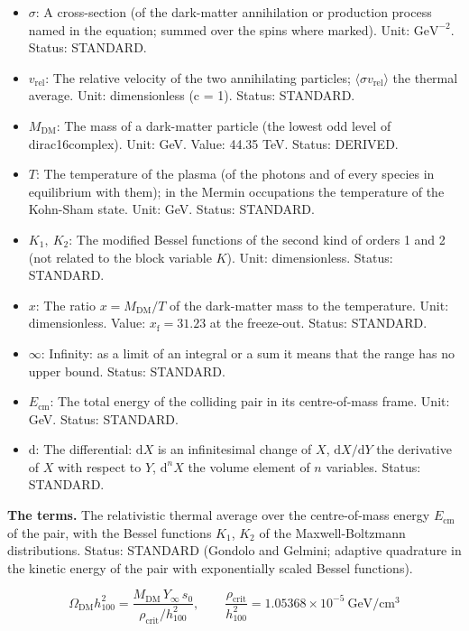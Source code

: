 \documentclass[
  10pt,
]{article}
\providecommand{\tightlist}{%
  \setlength{\itemsep}{0pt}\setlength{\parskip}{0pt}}
\begin{document}
\begin{itemize}
\tightlist
\item
  \(\sigma\): A cross-section (of the dark-matter annihilation or
  production process named in the equation; summed over the spins where
  marked). Unit: \(\mathrm{GeV}^{-2}\). Status: STANDARD.
\item
  \(v_{\mathrm{rel}}\): The relative velocity of the two annihilating
  particles; \(\langle\sigma v_{\mathrm{rel}}\rangle\) the thermal
  average. Unit: dimensionless (c = 1). Status: STANDARD.
\item
  \(M_{\mathrm{DM}}\): The mass of a dark-matter particle (the lowest
  odd level of dirac16complex). Unit: GeV. Value: 44.35 TeV. Status:
  DERIVED.
\item
  \(T\): The temperature of the plasma (of the photons and of every
  species in equilibrium with them); in the Mermin occupations the
  temperature of the Kohn-Sham state. Unit: GeV. Status: STANDARD.
\item
  \(K_1,\ K_2\): The modified Bessel functions of the second kind of
  orders 1 and 2 (not related to the block variable \(K\)). Unit:
  dimensionless. Status: STANDARD.
\item
  \(x\): The ratio \(x = M_{\mathrm{DM}}/T\) of the dark-matter mass to
  the temperature. Unit: dimensionless. Value:
  \(x_{\mathrm{f}} = 31.23\) at the freeze-out. Status: STANDARD.
\item
  \(\infty\): Infinity: as a limit of an integral or a sum it means that
  the range has no upper bound. Status: STANDARD.
\item
  \(E_{\mathrm{cm}}\): The total energy of the colliding pair in its
  centre-of-mass frame. Unit: GeV. Status: STANDARD.
\item
  \(\mathrm{d}\): The differential: \(\mathrm{d}X\) is an infinitesimal
  change of \(X\), \(\mathrm{d}X/\mathrm{d}Y\) the derivative of \(X\)
  with respect to \(Y\), \(\mathrm{d}^nX\) the volume element of \(n\)
  variables. Status: STANDARD.
\end{itemize}

\textbf{The terms.} The relativistic thermal average over the
centre-of-mass energy \(E_{\mathrm{cm}}\) of the pair, with the Bessel
functions \(K_1\), \(K_2\) of the Maxwell-Boltzmann distributions.
Status: STANDARD (Gondolo and Gelmini; adaptive quadrature in the
kinetic energy of the pair with exponentially scaled Bessel functions).

\[
\Omega_{\mathrm{DM}}h_{100}^2 = \frac{M_{\mathrm{DM}}\,Y_\infty\,s_0}{\rho_{\mathrm{crit}}/h_{100}^2},\qquad
\frac{\rho_{\mathrm{crit}}}{h_{100}^2} = 1.05368\times10^{-5}\ \text{GeV}/\text{cm}^3 \tag{FE-126}
\]
\end{document}
